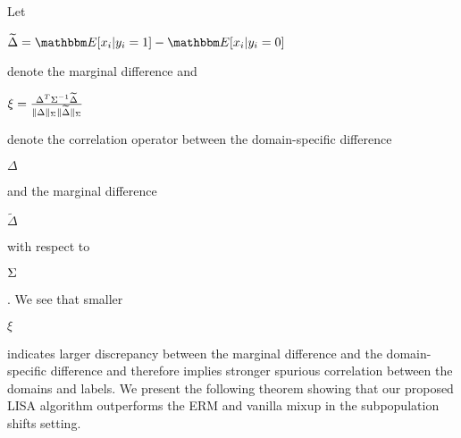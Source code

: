 Let \begin{small}$\widetilde{\Delta}=\E[x_i|y_i=1]-\E[x_i|y_i=0]$\end{small} denote the marginal difference and \begin{small}$\xi=\frac{\Delta^T\Sigma^{-1}\widetilde{\Delta}}{\|\Delta\|_{\Sigma}\|\widetilde{\Delta}\|_{\Sigma}}$\end{small} denote the correlation operator between the domain-specific difference \begin{small}$\Delta$\end{small} and the marginal difference \begin{small}$\widetilde{\Delta}$\end{small} with respect to \begin{small}$\Sigma$\end{small}. We see that smaller \begin{small}$\xi$\end{small} indicates larger discrepancy between the marginal difference and the domain-specific difference and therefore implies stronger spurious correlation between the domains and labels. We present the following theorem showing that our proposed LISA algorithm outperforms the ERM and vanilla mixup in the subpopulation shifts setting. 

